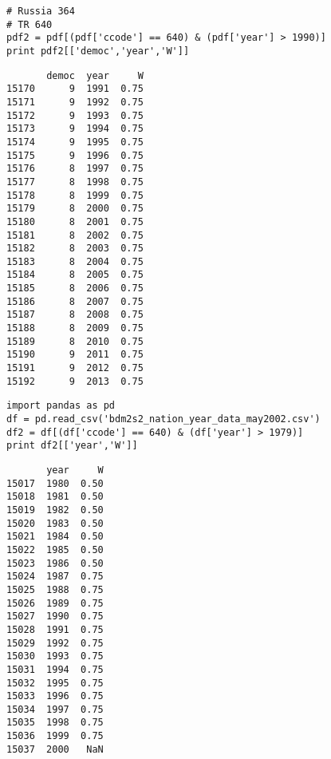 \documentclass[12pt,fleqn]{article}\usepackage{common}
\begin{document}
\begin{verbatim}
# Russia 364
# TR 640
pdf2 = pdf[(pdf['ccode'] == 640) & (pdf['year'] > 1990)]
print pdf2[['democ','year','W']]
\end{verbatim}

\begin{verbatim}
       democ  year     W
15170      9  1991  0.75
15171      9  1992  0.75
15172      9  1993  0.75
15173      9  1994  0.75
15174      9  1995  0.75
15175      9  1996  0.75
15176      8  1997  0.75
15177      8  1998  0.75
15178      8  1999  0.75
15179      8  2000  0.75
15180      8  2001  0.75
15181      8  2002  0.75
15182      8  2003  0.75
15183      8  2004  0.75
15184      8  2005  0.75
15185      8  2006  0.75
15186      8  2007  0.75
15187      8  2008  0.75
15188      8  2009  0.75
15189      8  2010  0.75
15190      9  2011  0.75
15191      9  2012  0.75
15192      9  2013  0.75
\end{verbatim}


\begin{verbatim}
import pandas as pd
df = pd.read_csv('bdm2s2_nation_year_data_may2002.csv')
df2 = df[(df['ccode'] == 640) & (df['year'] > 1979)]
print df2[['year','W']]
\end{verbatim}

\begin{verbatim}
       year     W
15017  1980  0.50
15018  1981  0.50
15019  1982  0.50
15020  1983  0.50
15021  1984  0.50
15022  1985  0.50
15023  1986  0.50
15024  1987  0.75
15025  1988  0.75
15026  1989  0.75
15027  1990  0.75
15028  1991  0.75
15029  1992  0.75
15030  1993  0.75
15031  1994  0.75
15032  1995  0.75
15033  1996  0.75
15034  1997  0.75
15035  1998  0.75
15036  1999  0.75
15037  2000   NaN
\end{verbatim}
\end{document}
